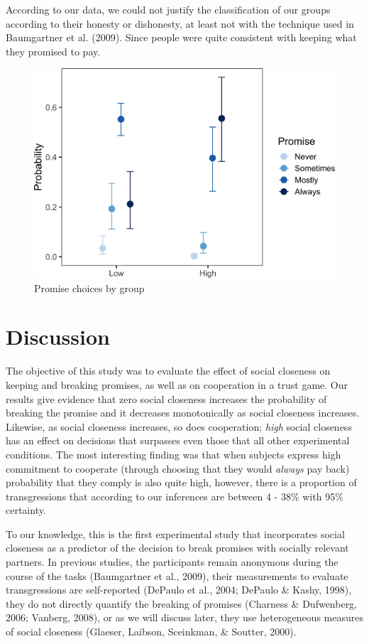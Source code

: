 \documentclass[12pt,]{article}
\begin{document}
According to our data, we could not justify the classification of our
groups according to their honesty or dishonesty, at least not with the
technique used in Baumgartner et al. (2009). Since people were quite
consistent with keeping what they promised to pay.

\begin{figure}

{\centering \includegraphics[width=0.8\linewidth]{article_english_files/figure-latex/fig7-1} 

}

\caption{Promise choices by group}\label{fig:fig7}
\end{figure}

\hypertarget{discussion}{%
\section{Discussion}\label{discussion}}

The objective of this study was to evaluate the effect of social
closeness on keeping and breaking promises, as well as on cooperation in
a trust game. Our results give evidence that zero social closeness
increases the probability of breaking the promise and it decreases
monotonically as social closeness increases. Likewise, as social
closeness increases, so does cooperation; \emph{high} social closeness
has an effect on decisions that surpasses even those that all other
experimental conditions. The most interesting finding was that when
subjects express high commitment to cooperate (through choosing that
they would \emph{always} pay back) probability that they comply is also
quite high, however, there is a proportion of transgressions that
according to our inferences are between 4 - 38\% with 95\% certainty.

To our knowledge, this is the first experimental study that incorporates
social closeness as a predictor of the decision to break promises with
socially relevant partners. In previous studies, the participants remain
anonymous during the course of the tasks (Baumgartner et al., 2009),
their measurements to evaluate transgressions are self-reported (DePaulo
et al., 2004; DePaulo \& Kashy, 1998), they do not directly quantify the
breaking of promises (Charness \& Dufwenberg, 2006; Vanberg, 2008), or
as we will discuss later, they use heterogeneous measures of social
closeness (Glaeser, Laibson, Sceinkman, \& Soutter, 2000).
\end{document}

